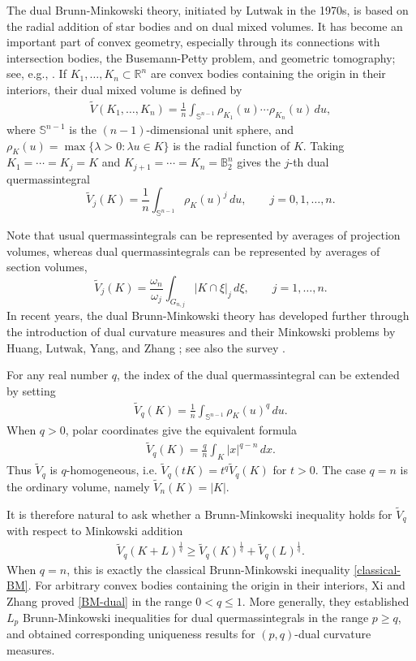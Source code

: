 \documentclass[12pt,leqno]{amsart}
\theoremstyle{plain} \newtheorem{thm}{Theorem}[section]
\theoremstyle{plain} \newtheorem{prop}[thm]{Proposition}
\theoremstyle{plain} \newtheorem{prob}[thm]{Problem}
\theoremstyle{definition} \newtheorem{defi}[thm]{Definition}
\theoremstyle{plain} \newtheorem{cor}[thm]{Corollary}
\theoremstyle{plain} \newtheorem{lem}[thm]{Lemma}
\theoremstyle{plain} \newtheorem{eg}{Example}[section]
\theoremstyle{remark} \newtheorem{rmk}[thm]{Remark}
\theoremstyle{plain} \newtheorem{conj}{Conjecture}
\numberwithin{equation}{section}
\newcommand{\bR}{\mathbb{R}}
\newcommand{\bS}{\mathbb{S}}
\newcommand{\bB}{\mathbb{B}}
\newcommand{\tV}{\widetilde V}
\newcommand{\dd}{\,d}
\begin{document}
The dual Brunn-Minkowski theory, initiated by Lutwak \cite{Lut75} in the 1970s, is based on the radial addition of star bodies and on dual mixed volumes. It has become an important part of convex geometry, especially through its connections with intersection bodies, the Busemann-Petty problem, and geometric tomography; see, e.g., \cite{Lut88,Gar06,Kold05,Zha99}.
If $K_1,\ldots,K_n\subset \bR^n$ are convex bodies containing the origin in their interiors, their dual mixed volume is defined by
\begin{align}\label{def-dual-mixed-volume}
    \widetilde V(K_1,\ldots,K_n)
    =\frac1n\int_{\bS^{n-1}}\rho_{K_1}(u)\cdots \rho_{K_n}(u)\dd u,
\end{align}
where $\mathbb{S}^{n-1}$ is the $(n-1)$-dimensional unit sphere, and $\rho_K(u)=\max\{\lambda>0:\lambda u\in K\}$ is the radial function of $K$.
Taking $K_1=\cdots=K_j=K$ and $K_{j+1}=\cdots=K_n=\bB^n_2$ gives the $j$-th dual quermassintegral
\[
    \widetilde V_j(K)=\frac1n\int_{\bS^{n-1}}\rho_K(u)^j\dd u,
    \qquad j=0,1,\ldots,n.
\]

Note that usual quermassintegrals can be represented by averages of projection volumes, whereas dual quermassintegrals can be represented by averages of section volumes,
\[
    \widetilde V_j(K)
    =
    \frac{\omega_n}{\omega_j}
    \int_{G_{n,j}} |K\cap \xi|_j\,d\xi,
    \qquad j=1,\ldots,n.
\]
In recent years, the dual Brunn-Minkowski theory has developed further through the introduction of dual curvature measures and their Minkowski problems by Huang, Lutwak, Yang, and Zhang \cite{HLYZ16}; see also the survey \cite{HYZ25}.

For any real number $q$, the index of the dual quermassintegral can be extended by setting
\begin{align}\label{def-dual-q}
    \tV_q(K)=\frac1n\int_{\bS^{n-1}}\rho_K(u)^q\dd u.
\end{align}
When $q>0$, polar coordinates give the equivalent formula
\begin{align}\label{polar-dual-q}
    \tV_q(K)=\frac qn\int_K |x|^{q-n}\dd x.
\end{align}
Thus $\tV_q$ is $q$-homogeneous, i.e. $\tV_q(tK)=t^q\tV_q(K)$ for $t>0$. The case $q=n$ is the ordinary volume, namely $\tV_n(K)=|K|$.

It is therefore natural to ask whether a Brunn-Minkowski inequality holds for $\tV_q$ with respect to Minkowski addition
\begin{align}\label{BM-dual}
    \tV_q(K+L)^{\frac1q}\geq \tV_q(K)^{\frac1q}+\tV_q(L)^{\frac1q}.
\end{align}
When $q=n$, this is exactly the classical Brunn-Minkowski inequality 
\eqref{classical-BM}. For arbitrary convex bodies containing the origin in their interiors, Xi and Zhang \cite{XZ22} proved \eqref{BM-dual} in the range $0<q\leq 1$. More generally, they established $L_p$ Brunn-Minkowski inequalities for dual quermassintegrals in the range $p\geq q$, and obtained corresponding uniqueness results for $(p,q)$-dual curvature measures.
\end{document}
